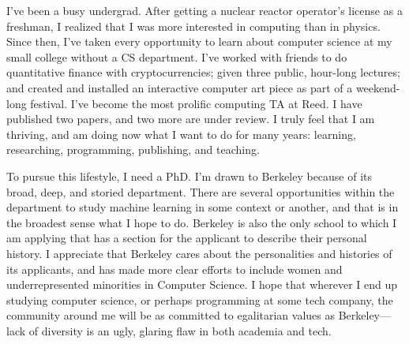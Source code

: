 \documentclass{article}
\begin{document}
I've been a busy undergrad. After getting a nuclear reactor operator's license as a freshman, I realized that I was more interested in computing than in physics. Since then, I've taken every opportunity to learn about computer science at my small college without a CS department. I've worked with friends to do quantitative finance with cryptocurrencies; given three public, hour-long lectures; and created and installed an interactive computer art piece as part of a weekend-long festival. I've become the most prolific computing TA at Reed. I have published two papers, and two more are under review. I truly feel that I am thriving, and am doing now what I want to do for many years: learning, researching, programming, publishing, and teaching.

To pursue this lifestyle, I need a PhD. I'm drawn to Berkeley because of its broad, deep, and storied department. There are several opportunities within the department to study machine learning in some context or another, and that is in the broadest sense what I hope to do. Berkeley is also the only school to which I am applying that has a section for the applicant to describe their personal history. I appreciate that Berkeley cares about the personalities and histories of its applicants, and has made more clear efforts to include women and underrepresented minorities in Computer Science. I hope that wherever I end up studying computer science, or perhaps programming at some tech company, the community around me will be as committed to egalitarian values as Berkeley---lack of diversity is an ugly, glaring flaw in both academia and tech.
\end{document}
